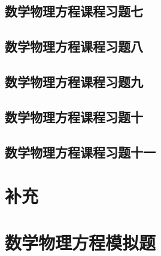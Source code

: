 \subsection{数学物理方程课程习题七}

\subsection{数学物理方程课程习题八}

\subsection{数学物理方程课程习题九}

\subsection{数学物理方程课程习题十}

\subsection{数学物理方程课程习题十一}

\newpage
\section{补充}

\newpage

\newpage
\section{数学物理方程模拟题}




